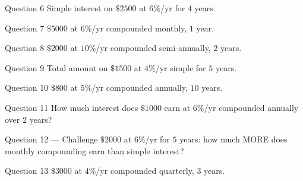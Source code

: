 \documentclass[11pt]{article}
\begin{document}
\begin{qbox}{Question 6}
Simple interest on $\$2500$ at $6\%$/yr for $4$ years.\workspace{2.4cm}
\end{qbox}

\begin{qbox}{Question 7}
$\$5000$ at $6\%$/yr compounded monthly, $1$ year.\workspace{2.4cm}
\end{qbox}

\begin{qbox}{Question 8}
$\$2000$ at $10\%$/yr compounded semi-annually, $2$ years.\workspace{2.4cm}
\end{qbox}

\begin{qbox}{Question 9}
Total amount on $\$1500$ at $4\%$/yr simple for $5$ years.\workspace{2.4cm}
\end{qbox}

\begin{qbox}{Question 10}
$\$800$ at $5\%$/yr compounded annually, $10$ years.\workspace{2.4cm}
\end{qbox}

\begin{qbox}{Question 11}
How much interest does $\$1000$ earn at $6\%$/yr compounded annually over $2$ years?\workspace{2.4cm}
\end{qbox}

\begin{qbox}{Question 12 --- Challenge}
$\$2000$ at $6\%$/yr for $5$ years: how much MORE does monthly compounding earn than simple interest?\workspace{3.2cm}
\end{qbox}

\begin{qbox}{Question 13}
$\$3000$ at $4\%$/yr compounded quarterly, $3$ years.\workspace{2.4cm}
\end{qbox}

\clearpage
{}
\end{document}
